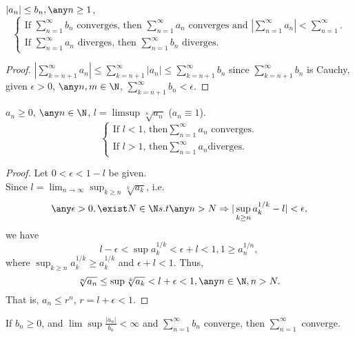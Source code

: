 \begin{theorem}
\label{Comparison Test}
     $|a_n| \leq b_n, \any n \geq 1$, 
 \[
 \begin{cases}
        \text{If $\sum_{n=1}^\infty b_n$ converges, then $\sum_{n=1}^\infty a_n$ converges and $\left|\sum_{n=1}^\infty a_n \right| < \sum_{n=1}^\infty$}. \\
        \text {If $\sum_{n=1}^\infty a_n$ diverges, then $\sum_{n=1}^\infty b_n$ diverges.}
    \end{cases}
\]    
\end{theorem}
\begin{proof}
    $\left|\sum_{k=n+1}^\infty a_n \right| \leq \sum_{k=n+1}^\infty |a_n| \leq \sum_{k=n+1}^\infty b_n$ since $\sum_{k=n+1}^\infty b_n$ is Cauchy, given $\epsilon > 0$, $\any n,m \in \N$, $\sum_{k=n+1}^\infty b_n <\epsilon$.
\end{proof}

\begin{theorem}
\label{Root Test}
    $a_n \geq 0$, $\any n \in \N$, $l = \limsup \sqrt[n]{a_n}$ ($a_n \equiv 1$).
\[    
    \begin{cases}
        \text{If } l <1 \text{, then} \sum_{n=1}^\infty a_n \text{ converges.} \\
        \text{If } l > 1 \text{, then} \sum_{n=1}^\infty a_n \text{diverges.}
    \end{cases}
\]
\end{theorem}
\begin{proof}
    Let $0<\epsilon<1-l$ be given. \\
    Since $l=\lim_{n\to\infty} \sup_{k \geq n} \sqrt[k]{a_k}$, i.e. 
    \[
    \any \epsilon > 0, \exist N \in \N s.t \any n > N \Rightarrow |\sup_{k\geq n} a^{1/k}_k - l| < \epsilon,
    \]
    we have
    \[
    l-\epsilon < \sup a_k^{1/k} < \epsilon + l < 1 , 1\geq a_n^{1/n},
    \]
    where $\sup_{k\geq n} a_k^{1/k} \geq a_k^{1/k}$ and $\epsilon + l < 1$. Thus,
    \[
    \sqrt[n]{a_n} \leq \sup\sqrt[k]{a_k} < l + \epsilon <1, \any n \in \N, n >N.
    \]
    That is, $a_n \leq r^n$, $r=l + \epsilon < 1$.
\end{proof}

\begin{theorem}
\label{Limit Comparison Test}
    If $b_n \geq 0$,  and $\lim \sup \frac{|a_n|}{b_n} < \infty$ and $\sum_{n=1}^\infty b_n$ converge, then $\sum_{n=1}^\infty$ converge.
\end{theorem}

